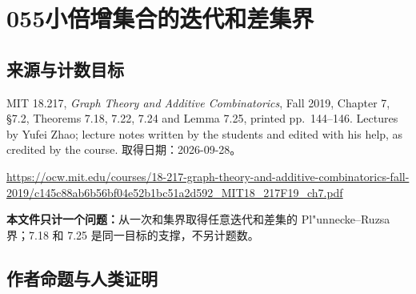 \documentclass[UTF8,11pt]{ctexart}
\theoremstyle{definition}
\begin{document}
\section*{055\quad 小倍增集合的迭代和差集界}
\subsection*{来源与计数目标}
MIT 18.217, \emph{Graph Theory and Additive Combinatorics}, Fall 2019, Chapter 7, \S7.2, Theorems 7.18, 7.22, 7.24 and Lemma 7.25, printed pp.~144--146. Lectures by Yufei Zhao; lecture notes written by the students and edited with his help, as credited by the course. 取得日期：2026-09-28。
\par\url{https://ocw.mit.edu/courses/18-217-graph-theory-and-additive-combinatorics-fall-2019/c145c88ab6b56bf04e52b1bc51a2d592_MIT18_217F19_ch7.pdf}
\par\textbf{本文件只计一个问题：}从一次和集界取得任意迭代和差集的 Pl"unnecke--Ruzsa 界；7.18 和 7.25 是同一目标的支撑，不另计题数。
\subsection*{作者命题与人类证明}
\end{document}
